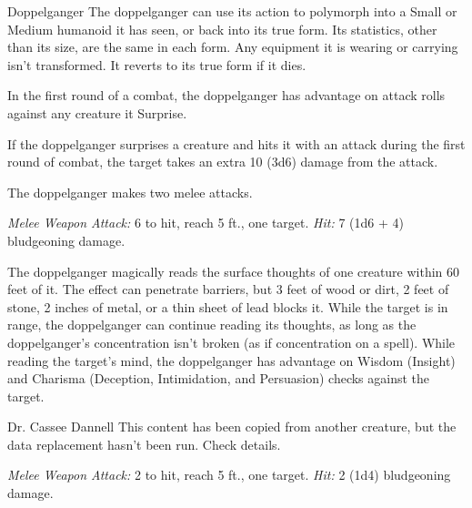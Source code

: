 \documentclass[10pt,a4paper,twoside,bg=print,twocolumn,openany,nodeprecatedcode]{dndbook}
\begin{document}
\begin{DndMonster}[float=t]{Doppelganger}
\DndMonsterBasics[
armor-class = {14},
hit-points = {\DndDice{8d8 + 16}},
speed = {30 ft.}
]
\DndMonsterAbilityScores[
 str = 11,
 dex = 18,
 con = 14,
 int = 11,
 wis = 12,
 cha = 14
]
\DndMonsterDetails[
skills = {Deception +6, Insight +3},
condition-immunities = {charmed},
senses = {darkvision 60 ft., passive perception 11},
languages = {Common},
challenge = 3,
]
The doppelganger can use its action to polymorph into a Small or Medium humanoid it has seen, or back into its true form. Its statistics, other than its size, are the same in each form. Any equipment it is wearing or carrying isn't transformed. It reverts to its true form if it dies.

In the first round of a combat, the doppelganger has advantage on attack rolls against any creature it Surprise.

If the doppelganger surprises a creature and hits it with an attack during the first round of combat, the target takes an extra 10 (3d6) damage from the attack.

The doppelganger makes two melee attacks.

\textsl{Melee Weapon Attack:} 6 to hit, reach 5 ft., one target. \textsl{Hit:} 7 (1d6 + 4) bludgeoning damage.

The doppelganger magically reads the surface thoughts of one creature within 60 feet of it. The effect can penetrate barriers, but 3 feet of wood or dirt, 2 feet of stone, 2 inches of metal, or a thin sheet of lead blocks it. While the target is in range, the doppelganger can continue reading its thoughts, as long as the doppelganger's concentration isn't broken (as if concentration on a spell). While reading the target's mind, the doppelganger has advantage on Wisdom (Insight) and Charisma (Deception, Intimidation, and Persuasion) checks against the target.

\end{DndMonster}


\clearpage

\begin{DndMonster}[float=t]{Dr. Cassee Dannell}
\DndMonsterBasics[
armor-class = {10},
hit-points = {\DndDice{1d8}},
speed = {30 ft.}
]
\DndMonsterAbilityScores[
 str = 10,
 dex = 10,
 con = 10,
 int = 10,
 wis = 10,
 cha = 10
]
\DndMonsterDetails[
languages = {any one language (usually Common)},
challenge = 0,
]
This content has been copied from another creature, but the data replacement hasn't been run. Check details.

\textsl{Melee Weapon Attack:} 2 to hit, reach 5 ft., one target. \textsl{Hit:} 2 (1d4) bludgeoning damage.

\end{DndMonster}
\end{document}
